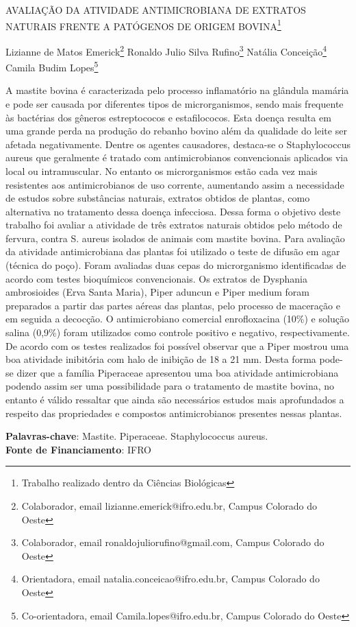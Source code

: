 \documentclass[article,12pt,onesidea,4paper,english,brazil]{abntex2}
\begin{document}
	
	
	\frenchspacing 
	
	\begin{center}
		\LARGE AVALIAÇÃO DA ATIVIDADE ANTIMICROBIANA DE EXTRATOS NATURAIS FRENTE A PATÓGENOS DE ORIGEM BOVINA\footnote{Trabalho realizado dentro da Ciências Biológicas}
		
		\normalsize
		Lizianne de Matos Emerick\footnote{Colaborador, email lizianne.emerick@ifro.edu.br, Campus Colorado do Oeste} 
		Ronaldo Julio Silva Rufino\footnote{Colaborador, email ronaldojuliorufino@gmail.com, Campus Colorado do Oeste} 
		Natália Conceição\footnote{Orientadora, email natalia.conceicao@ifro.edu.br, Campus Colorado do Oeste} 
	Camila Budim Lopes\footnote{Co-orientadora, email Camila.lopes@ifro.edu.br, Campus Colorado do Oeste} 
	\end{center}
	
	\noindent A mastite bovina é caracterizada pelo processo inflamatório na glândula mamária e pode ser causada por diferentes tipos de microrganismos, sendo mais frequente às bactérias dos gêneros estreptococos e estafilococos. Esta doença resulta em uma grande perda na produção do rebanho bovino além da qualidade do leite ser afetada negativamente. Dentre os agentes causadores, destaca-se o Staphylococcus aureus que geralmente é tratado com antimicrobianos convencionais aplicados via local ou intramuscular. No entanto os microrganismos estão cada vez mais resistentes aos antimicrobianos de uso corrente, aumentando assim a necessidade de estudos sobre substâncias naturais, extratos obtidos de plantas, como alternativa no tratamento dessa doença infecciosa. Dessa forma o objetivo deste trabalho foi avaliar a atividade de três extratos naturais obtidos pelo método de fervura, contra S. aureus isolados de animais com mastite bovina. Para avaliação da atividade antimicrobiana das plantas foi utilizado o teste de difusão em agar (técnica do poço). Foram avaliadas duas cepas do microrganismo identificadas de acordo com testes bioquímicos convencionais. Os extratos de Dysphania ambrosioides (Erva Santa Maria), Piper aduncun e Piper medium foram preparados a partir das partes aéreas das plantas, pelo processo de maceração e em seguida a decocção. O antimicrobiano comercial enrofloxacina (10\%) e solução salina (0,9\%) foram utilizados como controle positivo e negativo, respectivamente. De acordo com os testes realizados foi possível observar que a Piper mostrou uma boa atividade inibitória com halo de inibição de 18 a 21 mm. Desta forma pode-se dizer que a família Piperaceae apresentou uma boa atividade antimicrobiana podendo assim ser uma possibilidade para o tratamento de mastite bovina, no entanto é válido ressaltar que ainda são necessários estudos mais aprofundados a respeito das propriedades e compostos antimicrobianos presentes nessas plantas.
	
	\vspace{\onelineskip}
	
	\noindent
	\textbf{Palavras-chave}: Mastite. Piperaceae. Staphylococcus aureus. \\
	\textbf{Fonte de Financiamento}: IFRO 
	
\end{document}
